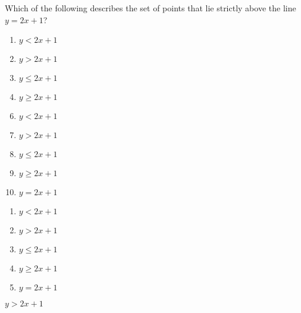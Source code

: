 


 Which of the following describes the set of points that lie strictly above the line $y=2x+1$?


\ifsat
	\begin{enumerate}[label=\Alph*)]
		\item   $y<2x+1$ 
		\item  $y>2x+1$%
		\item  $y \leq 2x+1$
		\item   $y \geq 2x+1$ 
	\end{enumerate}
\else
\fi

\ifacteven
	\begin{enumerate}[label=\textbf{\Alph*.},itemsep=\fill,align=left]
		\setcounter{enumii}{5}
		\item   $y<2x+1$ 
		\item  $y>2x+1$%
		\item  $y \leq 2x+1$
		\addtocounter{enumii}{1}
		\item   $y \geq 2x+1$ 
		\item   $y = 2x+1$
	\end{enumerate}
\else
\fi

\ifactodd
	\begin{enumerate}[label=\textbf{\Alph*.},itemsep=\fill,align=left]
		\item   $y<2x+1$ 
		\item  $y>2x+1$%
		\item  $y \leq 2x+1$
		\item   $y \geq 2x+1$ 
		\item   $y = 2x+1$
	\end{enumerate}
\else
\fi

\ifgridin
  $y>2x+1$%
		
\else
\fi

